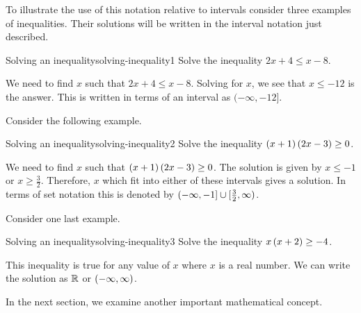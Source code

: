 To illustrate the use of this notation relative to intervals consider three
examples of inequalities. Their solutions will be written in the interval notation
just described.

\begin{example}{Solving an inequality}{solving-inequality1}
Solve the inequality $2x+4\leq x-8$.
\end{example}

\begin{solution}
We need to find $x$ such that $2x+4\leq x-8$. Solving for $x$, we see that 
$x\leq -12$ is the answer. This is written in terms of an interval as $(-\infty ,-12]$.
\end{solution}

Consider the following example.

\begin{example}{Solving an inequality}{solving-inequality2}
Solve the inequality $\left(x+1\right) \left(2x-3\right) \geq0$.
\end{example}

\begin{solution}
We need to find $x$ such that $\left(x+1\right) \left(2x-3\right) \geq0$. 
The solution is given by  $x\leq -1$ or $x\geq \frac{3}{2}$. Therefore, 
$x$ which fit into either of these intervals gives a solution. In terms of set notation this is denoted by $(-\infty ,-1]\cup
[ \vspace{0.05in}\frac{3}{2},\infty )$.
\end{solution}

Consider one last example.

\begin{example}{Solving an inequality}{solving-inequality3}
Solve the inequality $x \left(x+2\right) \geq-4$.
\end{example}

\begin{solution}
This inequality is true for any value of $x$ where $x$ is a real number. We can write the solution as $\mathbb{R}$ or $\left(
-\infty ,\infty \right)$.
\end{solution}

In the next section, we examine another important mathematical concept.
